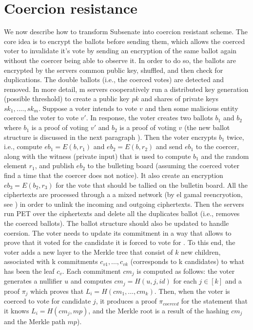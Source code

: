 \documentclass[]{paper}
\newcommand{\doron}[1]{\todo[inline,color=red!20!white]{\textbf{Comment:} #1}}
\begin{document}
\section{Coercion resistance}
We now describe how to  transform Subsenate into coercion resistant scheme. The core idea is to encrypt the ballots before sending them, which allows the  coerced voter to invalidate it's vote by sending an encryption of the same ballot again without the coercer being able to observe it. In order to do so, the ballots are encrypted by the servers common public key, shuffled, and then check for duplications. The double ballots (i.e., the coerced votes) are detected and removed. In more detail, m servers cooperatively run a distributed key generation (possible threshold) to create a public key $pk$ and shares of private keys $sk_1,....,sk_m$.  Suppose a voter intends to vote  $v$ and then some malicious entity coerced the voter to vote  $v'$. In response, the voter creates two ballots $b_1$ and $b_2$ where $b_1$ is a proof of voting  $v'$ and $b_2$ is a proof of voting $v$ (the new ballot structure is discussed in the next paragraph ). Then the voter encrypts $b_1$ twice, i.e.,  compute  $eb_1 = E(b, r_1)$ and $eb_2 = E(b,r_2)$ and send $eb_1$ to the coercer, along with the witness (private input) that is used to compute $b_1$ and the random element $r_1$, and publish $eb_2$ to the bulleting board (assuming the coerced voter find a time that the coercer does not notice). It also create an encryption $eb_3 = E(b_2, r_3)$ for the vote that should be tallied on the bulletin board. All the ciphertexts are processed through a
a mixed network (by el gamal reencryotion, see \cite{}) in order to unlink the incoming and outgoing ciphertexts. Then the servers run PET over the ciphertexts and delete all the duplicates ballot (i.e.,  removes the coerced ballots).
 The ballot structure should also be updated to handle coersion. The voter needs to update its commitment in a way that allows to prove that it voted for the candidate it is forced to vote for . To this end, the voter adds a new layer to the Merkle tree that consist of $k$ new children, associated with k commitments $c_{v1},...,c_{vk}$ (corresponds to k candidates)  to what has been the leaf $c_v$. Each commitment $cm_j$ is computed as follows: the voter generates a nullifier $u$ and computes $cm_{j} = H(u,j, id)$ for each $j\in [k]$ and a proof $\pi_j$ which proves that $L_i = H(cm_1,...,cm_k)$. Then, when the voter is coerced to vote for candidate $j$,  it produces a proof $\pi_{coerced}$ for the statement that it knows $L_i = H(cm_j, mp)$,  and the Merkle root is a result of the hashing $cm_j$ and the Merkle path $mp$). \doron{add a fig of the new Merkle tree}
\end{document}
